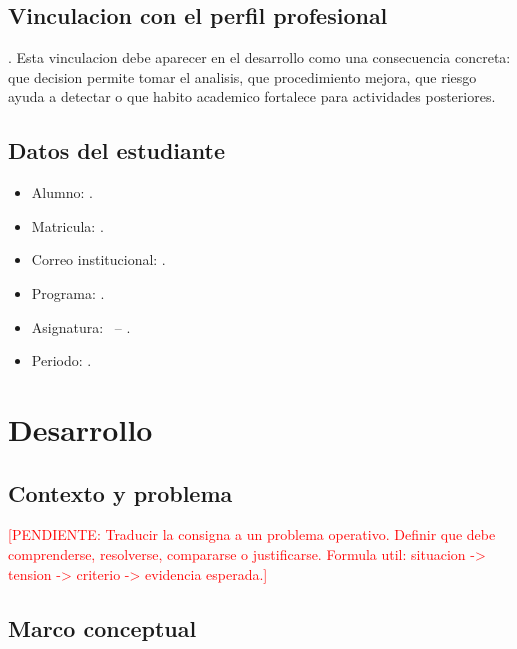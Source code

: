 \documentclass[
	spanish,
	letterpaper, oneside
]{article}
\newcommand{\pendiente}[1]{\textcolor{red}{[PENDIENTE: #1]}}
\begin{document}
\subsection{Vinculacion con el perfil profesional}

\itescaprofessionalprofile. Esta vinculacion debe aparecer en el desarrollo
como una consecuencia concreta: que decision permite tomar el analisis, que
procedimiento mejora, que riesgo ayuda a detectar o que habito academico
fortalece para actividades posteriores.

\subsection{Datos del estudiante}

\begin{itemize}
	\item Alumno: \itescastudentname.
	\item Matricula: \itescastudentid.
	\item Correo institucional: \itescastudentemail.
	\item Programa: \itescafaculty.
	\item Asignatura: \itescacoursecode\ -- \itescacoursename.
	\item Periodo: \itescaprogramperiod.
\end{itemize}


\section{Desarrollo}


\subsection{Contexto y problema}

\pendiente{Traducir la consigna a un problema operativo. Definir que debe comprenderse, resolverse, compararse o justificarse. Formula util: situacion -> tension -> criterio -> evidencia esperada.}

\subsection{Marco conceptual}
\end{document}
